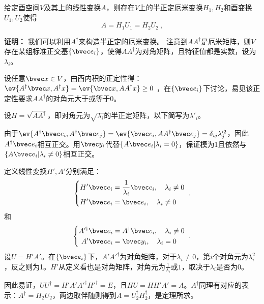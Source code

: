 
\begin{theorem}{}
给定酉空间$V$及其上的线性变换$A$，则存在$V$上的半正定厄米变换$H_1,H_2$和酉变换$U_1,U_2$使得
\begin{equation}
A=H_1U_1=H_2U_2~,
\end{equation}
\end{theorem}
\textbf{证明：}
我们可以利用$A^{\dagger}$来构造半正定的厄米变换。
注意到$AA^{\dagger}$是厄米矩阵，则$V$存在某组标准正交基$\{\bvec e_i\}$，使得$AA^{\dagger}$为对角矩阵，且特征值都是实数，设为$\lambda_i$。

设任意$\bvec x\in V$，由酉内积的正定性得：$\ev{A^{\dagger}\bvec x,A^{\dagger}x}=\ev{\bvec x,AA^{\dagger}x}\ge 0$
，在$\{\bvec e_i\}$下讨论，易见该正定性要求$AA^{\dagger}$的对角元大于或等于0。

设$H=\sqrt{AA^{\dagger}}$，即对角元为$\sqrt{\lambda_i}$的半正定矩阵，以下简写为$\lambda'_i$。

由于$\ev{A^{\dagger}\bvec e_i,A^{\dagger}\bvec e_j}=\ev{\bvec e_i,AA^{\dagger}\bvec e_j}=\delta_{ij}\lambda'^2_j$，因此$A^{\dagger}\bvec e_i$相互正交。用$\bvec y_i$代替$\{A\bvec e_i|\lambda_i=0\}$，保证模为1且依然与$\{A\bvec e_i|\lambda_i\neq 0\}$相互正交。

定义线性变换$H',A'$分别满足：
\begin{equation}
\left\{
    \begin{aligned}
    H'\bvec e_i&=\frac{1}{\lambda_i}\bvec e_i,\quad\lambda_i\neq 0\\
    H'\bvec e_i&=\bvec e_i,\quad\lambda_i\neq 0
    \end{aligned}
    \right.~.
\end{equation}
和
\begin{equation}
\left\{
    \begin{aligned}
    A'^{\dagger}\bvec e_i&=A^{\dagger}\bvec e_i,\quad\lambda_i\neq 0\\
    A'\bvec e_i&=\bvec y_i,\quad\lambda_i= 0
    \end{aligned}
    \right.~.
\end{equation}
设$U=H'A'$。在$\{\bvec e_i\}$下，$A'A'^{\dagger}$为对角矩阵，对于$\lambda_i\neq 0$，第$i$个对角元为$\lambda_i^2$，反之则为1。$H'$从定义看也是对角矩阵，对角元为$\frac{1}{\lambda_i}$或$1$，取决于$\lambda_i$是否为0。

因此易证，$UU^{\dagger}=H'A'A'^{\dagger}H'^{\dagger}=E$，且$HU=HH'A'=A$。$A^{\dagger}$同理有对应的表示：$A^{\dagger}=H_2U_2$，两边取伴随则得到$A=U_2^{\dagger}H^{\dagger}_2$，是定理所求。


